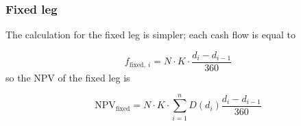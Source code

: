 %

\subsubsection{Fixed leg}\label{fixed-leg}

The calculation for the fixed leg is simpler; each cash flow is equal to

\begin{equation}
f_{\mathrm{fixed},~i}=N\cdot K\cdot \frac{d_i - d_{i-1}}{360}
\end{equation}
so the NPV of the fixed leg is

\begin{equation}
\mathrm{NPV}_{\mathrm{fixed}} = N\cdot K\cdot \sum_{i=1}^{n}D(d_{i})\frac{d_i - d_{i-1}}{360}
\end{equation}


